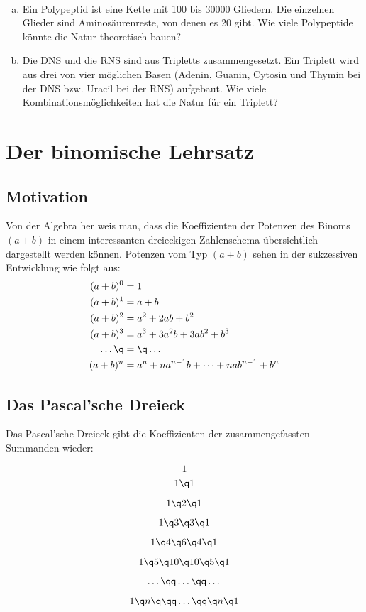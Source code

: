 \documentclass[%
11pt,%
twoside,%
titlepage,%
german,%
headsepline%
]{scrartcl}
\newcounter{theo}[section]\setcounter{theo}{0}
\begin{document}
\begin{ueb}[Polypeptide]
\ \\[-4ex]
\begin{enumerate}[a)]
\item Ein Polypeptid ist eine Kette mit 100 bis 30000 Gliedern. Die einzelnen Glieder sind Aminosäurenreste, von denen es 20 gibt. Wie viele Polypeptide könnte die Natur theoretisch bauen?
\item Die DNS und die RNS sind aus Tripletts zusammengesetzt. Ein Triplett wird aus drei von vier möglichen Basen (Adenin, Guanin, Cytosin und Thymin bei der DNS bzw. Uracil bei der RNS) aufgebaut. Wie viele Kombinationsmöglichkeiten hat die Natur für ein Triplett?
\end{enumerate}
\end{ueb}

\clearpage

\section{Der binomische Lehrsatz} \label{app:binomial}

\subsection{Motivation}

Von der Algebra her weis man, dass die Koeffizienten der Potenzen des Binoms $(a+b)$ in einem interessanten dreieckigen Zahlenschema übersichtlich dargestellt werden können.
Potenzen vom Typ $(a+b)$ sehen in der sukzessiven Entwicklung wie folgt aus:
\begin{align*}
(a+b)^0&=1\\
(a+b)^1&=a+b\\
(a+b)^2&=a^2+2ab+b^2\\
(a+b)^3&=a^3+3a^2b+3ab^2+b^3\\
\dots\q &= \q\dots\\
(a+b)^n&=a^n+na^{n-1}b+\dots+nab^{n-1}+b^n
\end{align*}

\subsection{Das Pascal'sche Dreieck}

Das Pascal'sche Dreieck gibt die Koeffizienten der zusammengefassten Summanden wieder:\\[-5ex]
\begin{center}
$$1$$
$$1\q1$$
$$1\q2\q1$$
$$1\q3\q3\q1$$
$$1\q4\q6\q4\q1$$
$$1\q5\q10\q10\q5\q1$$
$$\dots\qq\dots\qq\dots$$
$$1\q n\q\qq\dots\qq\q n\q1$$
\end{center}
\end{document}
